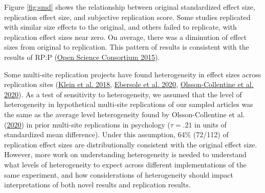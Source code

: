 \documentclass[
  english,
  a4paper,
]{article}
\begin{document}
Figure \ref{fig:smd} shows the relationship between original standardized effect size, replication effect size, and subjective replication score. Some studies replicated with similar size effects to the original, and others failed to replicate, with replication effect sizes near zero. On average, there was a diminution of effect sizes from original to replication. This pattern of results is consistent with the results of RP:P (\protect\hyperlink{ref-openscienceconsortium2015}{Open Science Consortium 2015}).

Some multi-site replication projects have found heterogeneity in effect sizes across replication sites (\protect\hyperlink{ref-klein2018}{Klein et al. 2018}, \protect\hyperlink{ref-ebersole2020}{Ebersole et al. 2020}, \protect\hyperlink{ref-olsson2020}{Olsson-Collentine et al. 2020}). As a test of sensitivity to heterogeneity, we assumed that the level of heterogeneity in hypothetical multi-site replications of our sampled articles was the same as the average level heterogeneity found by Olsson-Collentine et al. (\protect\hyperlink{ref-olsson2020}{2020}) in prior multi-site replications in psychology (\(\tau=.21\) in units of standardized mean difference). Under this assumption, 64\% (72/112) of replication effect sizes are distributionally consistent with the original effect size. However, more work on understanding heterogeneity is needed to understand what levels of heterogeneity to expect across different implementations of the same experiment, and how considerations of heterogeneity should impact interpretations of both novel results and replication results.
\end{document}
